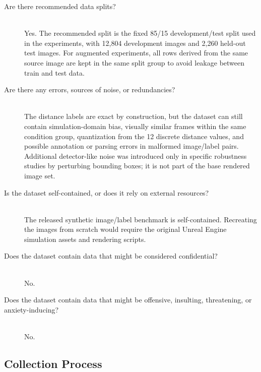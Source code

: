 \begin{description}
    \item[Are there recommended data splits?] \hfill \\{}
    Yes. The recommended split is the fixed 85/15 development/test split used
    in the experiments, with 12,804 development images and 2,260 held-out test
    images. For augmented experiments, all rows derived from the same source
    image are kept in the same split group to avoid leakage between train and
    test data.

    \item[Are there any errors, sources of noise, or redundancies?] \hfill \\{}
    The distance labels are exact by construction, but the dataset can still
    contain simulation-domain bias, visually similar frames within the same
    condition group, quantization from the 12 discrete distance values, and
    possible annotation or parsing errors in malformed image/label pairs.
    Additional detector-like noise was introduced only in specific robustness
    studies by perturbing bounding boxes; it is not part of the base rendered
    image set.

    \item[Is the dataset self-contained, or does it rely on external resources?] \hfill \\{}
    The released synthetic image/label benchmark is self-contained. Recreating
    the images from scratch would require the original Unreal Engine simulation
    assets and rendering scripts.

    \item[Does the dataset contain data that might be considered confidential?] \hfill \\{}
    No.

    \item[Does the dataset contain data that might be offensive, insulting, threatening, or anxiety-inducing?] \hfill \\{}
    No.
\end{description}

\subsection{Collection Process}

